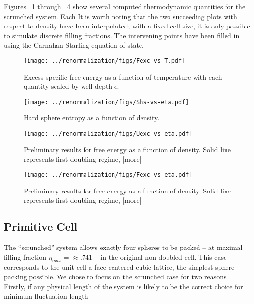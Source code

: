 \documentclass[12pt]{article}
\newcommand{\ignore}[1]{}
\begin{document}
Figures ~\ref{F-T} through ~\ref{F-eta} show several computed thermodynamic quantities for the scrunched system. Each  It is worth noting that the two succeeding plots with respect to density have been interpolated; with a fixed cell size, it is only possible to simulate discrete filling fractions. The intervening points have been filled in using the Carnahan-Starling equation of state.  
\begin{figure}[H]
\centering
    \texttt{[image: ../renormalization/figs/Fexc-vs-T.pdf]}
    \caption{Excess specific free energy as a function of temperature with each quantity scaled by well depth $\epsilon$. }
    \label{F-T}
\end{figure}



\begin{figure}
\centering
    \texttt{[image: ../renormalization/figs/Shs-vs-eta.pdf]}
    \caption{Hard sphere entropy as a function of density.}
    \label{Shs-eta}
\end{figure}
\ignore{Filling fraction or density? Value in distinction? We never use number density for the sake of units...}


\begin{figure}
    \centering
    \texttt{[image: ../renormalization/figs/Uexc-vs-eta.pdf]}
    \caption{Preliminary results for free energy as a function of density. Solid line represents first doubling regime, [more]}
    \label{U-eta}
\end{figure}


\begin{figure}
\centering
    \texttt{[image: ../renormalization/figs/Fexc-vs-eta.pdf]}
    \caption{Preliminary results for free energy as a function of density. Solid line represents first doubling regime, [more]}
    \label{F-eta}
\end{figure}

\subsection{Primitive Cell}
The ``scrunched'' system allows exactly four spheres to be packed -- at maximal filling fraction $\eta_{max} = \approx .741$ -- in the original non-doubled cell. This case corresponds to the unit cell a face-centered cubic lattice, the simplest sphere packing possible. We chose to focus on the scrunched case for two reasons. Firstly, if any physical length of the system is likely to be the correct choice for minimum fluctuation length 
\end{document}
